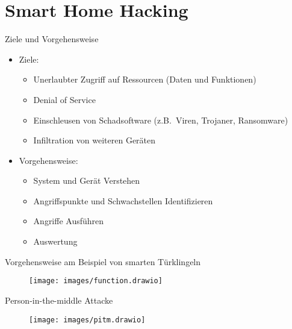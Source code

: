 \documentclass[11pt, aspectratio=169, modernfonts]{beamer}
\begin{document}
    \section{Smart Home Hacking}\label{sec:smart-home-hacking}

    \begin{frame}{Ziele und Vorgehensweise}
        \begin{itemize}
            \item Ziele:
            \begin{itemize}
                \item Unerlaubter Zugriff auf Ressourcen (Daten und Funktionen)
                \item Denial of Service
                \item Einschleusen von Schadsoftware (z.B.~Viren, Trojaner, Ransomware)
                \item Infiltration von weiteren Geräten
            \end{itemize}
            \item Vorgehensweise:
            \begin{itemize}
                \item System und Gerät Verstehen
                \item Angriffspunkte und Schwachstellen Identifizieren
                \item Angriffe Ausführen
                \item Auswertung
            \end{itemize}
        \end{itemize}
    \end{frame}

    \begin{frame}{Vorgehensweise am Beispiel von smarten Türklingeln}
        \begin{figure}
            \texttt{[image: images/function.drawio]}\label{fig:function}
        \end{figure}
    \end{frame}

    \begin{frame}{Person-in-the-middle Attacke}
        \begin{figure}
            \texttt{[image: images/pitm.drawio]}\label{fig:pitm}
        \end{figure}
    \end{frame}
\end{document}
